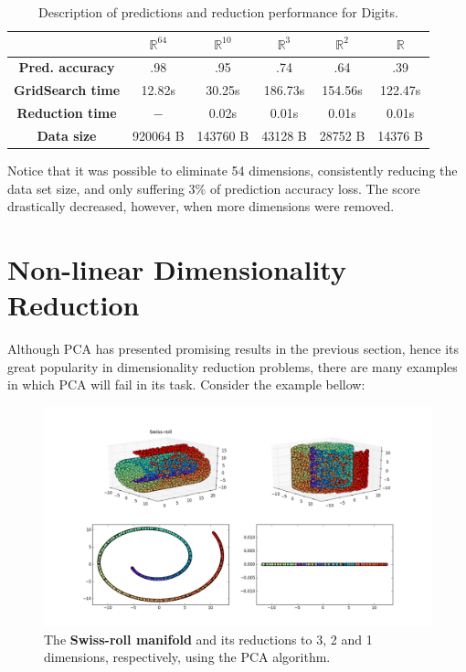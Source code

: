 \documentclass[12pt]{article}
\begin{document}
\begin{table}[H]
	\centering
	\begin{tabular}{|c|c|c|c|c|c|}
		\hline
		& \textbf{$\mathbb{R}^{64}$} & \textbf{$\mathbb{R}^{10}$} & \textbf{$\mathbb{R}^3$} & \textbf{$\mathbb{R}^2$} & \textbf{$\mathbb{R}$} \\\hline
		\textbf{Pred. accuracy}   & .98          & .95          & .74 & .64 & .39  \\\hline
		\textbf{GridSearch time} & 12.82s     & 30.25s     & 186.73s & 154.56s & 122.47s \\\hline
		\textbf{Reduction time}       & $-$          & 0.02s       & 0.01s & 0.01s & 0.01s \\\hline
		\textbf{Data size}           & 920064 B & 143760 B & 43128 B & 28752 B & 14376 B \\\hline
	\end{tabular}

	\caption{Description of predictions and reduction performance for Digits.}
\end{table}

Notice that it was possible to eliminate 54 dimensions, consistently reducing the data set size, and only suffering 3\% of prediction accuracy loss. The score drastically decreased, however, when more dimensions were removed.

\section{Non-linear Dimensionality Reduction}

Although PCA has presented promising results in the previous section, hence its great popularity in dimensionality reduction problems, there are many examples in which PCA will fail in its task. Consider the example bellow:

\begin{figure}[H]
	\centering
	\captionsetup{justification=centering}

	\includegraphics[width=\linewidth]{swiss_pca}
	\caption{The \textbf{Swiss-roll manifold} and its reductions to 3, 2 and 1 dimensions, respectively, using the PCA algorithm.}
	\label{fig:swiss_pca}
\end{figure}
\end{document}
